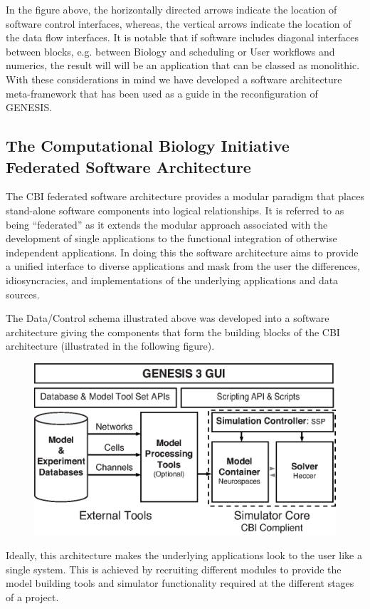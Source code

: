 \documentclass[12pt]{article}
\begin{document}
In the figure above, the horizontally directed arrows indicate the location of software control interfaces, whereas, the vertical arrows indicate the location of the data flow interfaces. It is notable that if software includes diagonal interfaces between blocks, e.g. between Biology and scheduling or User workflows and numerics, the result will will be an application that can be classed as monolithic. With these considerations in mind we have developed a software architecture meta-framework that has been used as a guide in the reconfiguration of GENESIS.

\subsection*{The Computational Biology Initiative Federated Software Architecture}

The CBI federated software architecture provides a modular paradigm that places stand-alone software components into logical relationships. It is referred to as being ``federated'' as it extends the modular approach  associated with the development of single applications to the functional integration of otherwise independent applications. In doing this the software architecture aims to provide a unified interface to diverse applications and mask from the user the differences, idiosyncracies, and implementations of the underlying applications and data sources.

The Data/Control schema illustrated above was developed into a software architecture giving the components that form the building blocks of the CBI architecture (illustrated in the following figure).  
\begin{figure}[h]
  \centering
 \includegraphics[scale=0.75]{figures/G3-Architecture-Overview-1.eps}
  \label{fig:architecture1}
\end{figure}
Ideally, this architecture makes the underlying applications look to the user like a single system. This is achieved by recruiting different modules to provide the model building tools and simulator functionality required at the different stages of a project.
\end{document}
